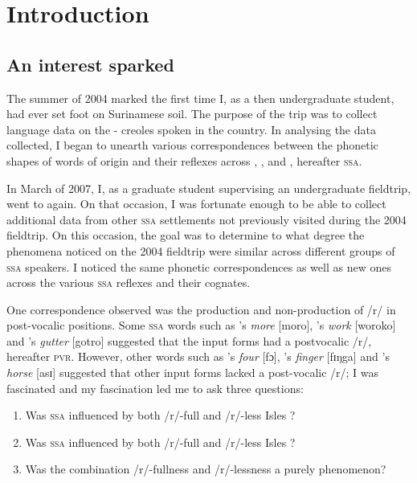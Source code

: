 \chapter{Introduction}\label{ch:1}

\section{An interest sparked} \label{1.1}
The summer of 2004 marked the first time I, as a then undergraduate student, had ever set foot on Surinamese soil. The purpose of the trip was to collect language data on the - creoles spoken in the country. In analysing the data collected, I began to unearth various correspondences between the phonetic shapes of words of  origin and their reflexes across , , and , hereafter \textsc{ssa}.

In March of 2007, I, as a graduate student supervising an undergraduate fieldtrip, went to  again. On that occasion, I was fortunate enough to be able to collect additional data from other \textsc{ssa}  settlements not previously visited during the 2004 fieldtrip. On this occasion, the goal was to determine to what degree the phenomena noticed on the 2004 fieldtrip were similar across different groups of \textsc{ssa}  speakers. I noticed the same phonetic correspondences as well as new ones across the various \textsc{ssa}  reflexes and their  cognates.

One correspondence observed was the production and non-production of /r/ in post-vocalic positions. Some \textsc{ssa}  words such as 's \emph{more} [moro], 's \emph{work} [woroko] and 's  \emph{gutter} [gotro] suggested that the  input forms had a postvocalic /r/, hereafter \textsc{pvr}. However, other words such as 's \emph{four} [fɔ], 's \emph{finger} [fɪŋga] and 's \emph{horse} [asɪ] suggested that other  input forms lacked a post-vocalic /r/; I was fascinated and my fascination led me to ask three questions:

\begin{enumerate}
\item Was \textsc{ssa}  influenced by both /r/-full and /r/-less  Isles  ?
\item Was \textsc{ssa}  influenced by both /r/-full and /r/-less  Isles  ?
\item Was the combination /r/-fullness and /r/-lessness a purely  phenomenon?
\end{enumerate}

